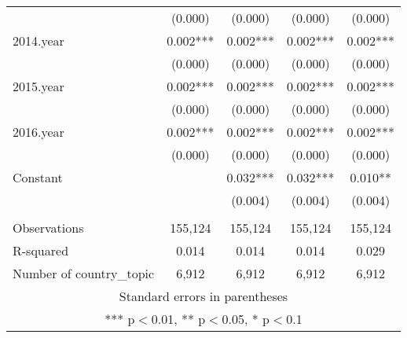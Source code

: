 \documentclass[]{article}
\begin{document}
\begin{tabular}{lcccc}
 & (0.000) & (0.000) & (0.000) & (0.000) \\
2014.year & 0.002*** & 0.002*** & 0.002*** & 0.002*** \\
 & (0.000) & (0.000) & (0.000) & (0.000) \\
2015.year & 0.002*** & 0.002*** & 0.002*** & 0.002*** \\
 & (0.000) & (0.000) & (0.000) & (0.000) \\
2016.year & 0.002*** & 0.002*** & 0.002*** & 0.002*** \\
 & (0.000) & (0.000) & (0.000) & (0.000) \\
Constant &  & 0.032*** & 0.032*** & 0.010** \\
 &  & (0.004) & (0.004) & (0.004) \\
 &  &  &  &  \\
Observations & 155,124 & 155,124 & 155,124 & 155,124 \\
R-squared & 0.014 & 0.014 & 0.014 & 0.029 \\
 Number of country\_topic & 6,912 & 6,912 & 6,912 & 6,912 \\ \hline
\multicolumn{5}{c}{ Standard errors in parentheses} \\
\multicolumn{5}{c}{ *** p$<$0.01, ** p$<$0.05, * p$<$0.1} \\
\end{tabular}
\end{document}
